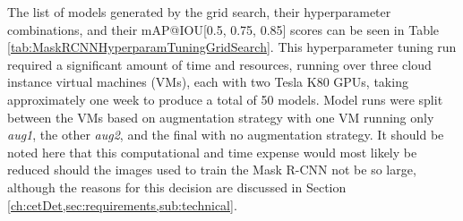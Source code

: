 The list of models generated by the grid search, their hyperparameter combinations, and their mAP@IOU[0.5, 0.75, 0.85] scores can be seen in Table \ref{tab:MaskRCNNHyperparamTuningGridSearch}. This hyperparameter tuning run required a significant amount of time and resources, running over three cloud instance virtual machines (VMs), each with two Tesla K80 GPUs, taking approximately one week to produce a total of 50 models. Model runs were split between the VMs based on augmentation strategy with one VM running only \textit{aug1}, the other \textit{aug2}, and the final with no augmentation strategy. It should be noted here that this computational and time expense would most likely be reduced should the images used to train the Mask R-CNN not be so large, although the reasons for this decision are discussed in Section \ref{ch:cetDet,sec:requirements,sub:technical}.

